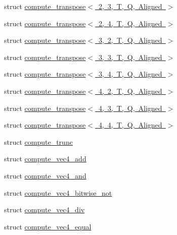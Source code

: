 \begin{DoxyCompactItemize}
\item 
struct \mbox{\hyperlink{structglm_1_1detail_1_1compute__transpose_3_012_00_013_00_01_t_00_01_q_00_01_aligned_01_4}{compute\+\_\+transpose$<$ 2, 3, T, Q, Aligned $>$}}
\item 
struct \mbox{\hyperlink{structglm_1_1detail_1_1compute__transpose_3_012_00_014_00_01_t_00_01_q_00_01_aligned_01_4}{compute\+\_\+transpose$<$ 2, 4, T, Q, Aligned $>$}}
\item 
struct \mbox{\hyperlink{structglm_1_1detail_1_1compute__transpose_3_013_00_012_00_01_t_00_01_q_00_01_aligned_01_4}{compute\+\_\+transpose$<$ 3, 2, T, Q, Aligned $>$}}
\item 
struct \mbox{\hyperlink{structglm_1_1detail_1_1compute__transpose_3_013_00_013_00_01_t_00_01_q_00_01_aligned_01_4}{compute\+\_\+transpose$<$ 3, 3, T, Q, Aligned $>$}}
\item 
struct \mbox{\hyperlink{structglm_1_1detail_1_1compute__transpose_3_013_00_014_00_01_t_00_01_q_00_01_aligned_01_4}{compute\+\_\+transpose$<$ 3, 4, T, Q, Aligned $>$}}
\item 
struct \mbox{\hyperlink{structglm_1_1detail_1_1compute__transpose_3_014_00_012_00_01_t_00_01_q_00_01_aligned_01_4}{compute\+\_\+transpose$<$ 4, 2, T, Q, Aligned $>$}}
\item 
struct \mbox{\hyperlink{structglm_1_1detail_1_1compute__transpose_3_014_00_013_00_01_t_00_01_q_00_01_aligned_01_4}{compute\+\_\+transpose$<$ 4, 3, T, Q, Aligned $>$}}
\item 
struct \mbox{\hyperlink{structglm_1_1detail_1_1compute__transpose_3_014_00_014_00_01_t_00_01_q_00_01_aligned_01_4}{compute\+\_\+transpose$<$ 4, 4, T, Q, Aligned $>$}}
\item 
struct \mbox{\hyperlink{structglm_1_1detail_1_1compute__trunc}{compute\+\_\+trunc}}
\item 
struct \mbox{\hyperlink{structglm_1_1detail_1_1compute__vec4__add}{compute\+\_\+vec4\+\_\+add}}
\item 
struct \mbox{\hyperlink{structglm_1_1detail_1_1compute__vec4__and}{compute\+\_\+vec4\+\_\+and}}
\item 
struct \mbox{\hyperlink{structglm_1_1detail_1_1compute__vec4__bitwise__not}{compute\+\_\+vec4\+\_\+bitwise\+\_\+not}}
\item 
struct \mbox{\hyperlink{structglm_1_1detail_1_1compute__vec4__div}{compute\+\_\+vec4\+\_\+div}}
\item 
struct \mbox{\hyperlink{structglm_1_1detail_1_1compute__vec4__equal}{compute\+\_\+vec4\+\_\+equal}}
\item 

\end{DoxyCompactItemize}
